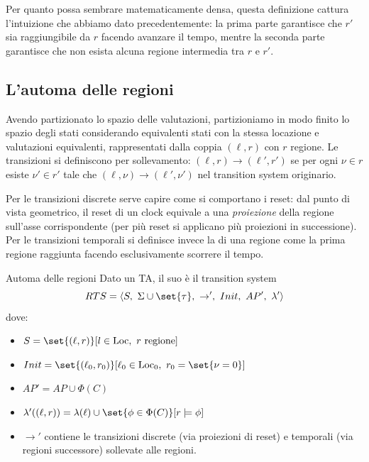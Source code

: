 Per quanto possa sembrare matematicamente densa, questa definizione cattura l'intuizione che abbiamo dato precedentemente: la prima parte garantisce che \(r'\) sia raggiungibile da \(r\) facendo avanzare il tempo, mentre la seconda parte garantisce che non esista alcuna regione intermedia tra \(r\) e \(r'\).

\subsection{L'automa delle regioni}

Avendo partizionato lo spazio delle valutazioni, partizioniamo in modo finito lo spazio degli stati considerando equivalenti stati con la stessa locazione e valutazioni equivalenti, rappresentati dalla coppia \((\ell, r)\) con \(r\) regione. Le transizioni si definiscono per sollevamento: \((\ell,r)\to(\ell',r')\) se per ogni \(\nu \in r\) esiste \(\nu' \in r'\) tale che \((\ell,\nu)\to (\ell',\nu')\) nel transition system originario.

Per le transizioni discrete serve capire come si comportano i reset: dal punto di vista geometrico, il reset di un clock equivale a una \emph{proiezione} della regione sull'asse corrispondente (per più reset si applicano più proiezioni in successione). Per le transizioni temporali si definisce invece la  di una regione come la prima regione raggiunta facendo esclusivamente scorrere il tempo.

\begin{definition}{Automa delle regioni}
  Dato un TA, il suo  è il transition system
  \[RTS =\langle S,\ \Sigma\cup\set{\tau},\ \to',\ Init,\ AP',\ \lambda'\rangle\]
  dove:
  \begin{itemize}
    \item \(S = \set{(\ell,r)}[l \in \Loc,\ r \text{ regione}]\)
    \item \(Init = \set{(\ell_0, r_0)}[\ell_0 \in \Loc_0,\ r_0 = \set{\nu = 0}]\)
    \item \(AP' = AP\cup \Phi(C)\)
    \item \(\lambda'((\ell,r)) = \lambda(\ell)\cup \set{\phi \in \Phi(C)}[r \models \phi]\)
    \item \(\to'\) contiene le transizioni discrete (via proiezioni di reset) e temporali (via regioni successore) sollevate alle regioni.
  \end{itemize}
\end{definition}

